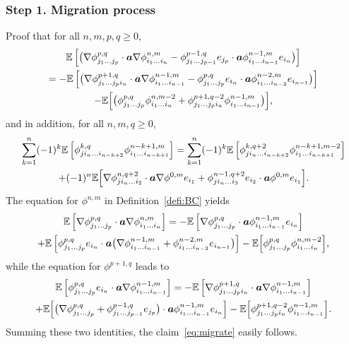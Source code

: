 \documentclass[10pt]{amsart}
\theoremstyle{plain}
\theoremstyle{definition}
\numberwithin{equation}{section}
\newcommand{\ee}{e}
\newcommand{\Aa}{\boldsymbol a}
\newcommand{\step}[1]{\subsubsection*{Step \textup #1}}
\newcommand{\expec}[1]{\mathbb{E}\left[ #1 \right]}
\newcommand{\Bexpec}[1]{\mathbb{E}\Bigl[ #1 \Bigr]}
\begin{document}
\step{1. Migration process} Proof that for all $n,m,p,q\ge0$,
\begin{multline}\label{eq:migrate}
\expec{\big(\nabla\phi^{p,q}_{j_1\ldots j_p}\cdot\Aa\nabla\phi^{n,m}_{i_1\ldots i_n}-\phi^{p-1,q}_{j_1\ldots j_{p-1}}\ee_{j_p}\cdot\Aa\phi^{n-1,m}_{i_1\ldots i_{n-1}}\ee_{i_n}\big)}\\
=-\expec{\big(\nabla\phi^{p+1,q}_{j_1\ldots j_{p}i_n}\cdot\Aa\nabla\phi^{n-1,m}_{i_1\ldots i_{n-1}}-\phi^{p,q}_{j_1\ldots j_{p}}\ee_{i_n}\cdot\Aa\phi^{n-2,m}_{i_1\ldots i_{n-2}}\ee_{i_{n-1}}\big)}\\
-\Bexpec{\big(\phi^{p,q}_{j_1\ldots j_p}\phi^{n,m-2}_{i_1\ldots i_n}+\phi^{p+1,q-2}_{j_1\ldots j_pi_n}\phi^{n-1,m}_{i_1\ldots i_{n-1}}\big)},
\end{multline}
and in addition, for all $n,m,q\ge0$,
\begin{multline}\label{eq:migrate-re}
\sum_{k=1}^n(-1)^k\expec{\phi^{k,q}_{ji_n\ldots i_{n-k+2}}\phi^{n-k+1,m}_{i_1\ldots i_{n-k+1}}}=\sum_{k=1}^{n}(-1)^k\expec{\phi^{k,q+2}_{ji_n\ldots i_{n-k+2}}\phi^{n-k+1,m-2}_{i_1\ldots i_{n-k+1}}}\\
+(-1)^n\Bexpec{\nabla\phi^{n,q+2}_{ji_n\ldots i_{2}}\cdot\Aa\nabla\phi^{0,m}\ee_{i_1}+\phi^{n-1,q+2}_{ji_n\ldots i_{3}}\ee_{i_{2}}\cdot\Aa\phi^{0,m}\ee_{i_{1}}}.
\end{multline}
The equation for $\phi^{n,m}$ in Definition~\ref{defi:BC} yields
\begin{multline*}
\expec{\nabla\phi^{p,q}_{j_1\ldots j_{p}}\cdot\Aa\nabla\phi^{n,m}_{i_1\ldots i_n}}=-\expec{\nabla\phi^{p,q}_{j_1\ldots j_{p}}\cdot\Aa\phi^{n-1,m}_{i_1\ldots i_{n-1}}\ee_{i_n}}\\
+\expec{\phi^{p,q}_{j_1\ldots j_{p}}\ee_{i_n}\cdot\Aa\big(\nabla\phi^{n-1,m}_{i_1\ldots i_{n-1}}+\phi^{n-2,m}_{i_1\ldots i_{n-2}}\ee_{i_{n-1}}\big)}
-\Bexpec{\phi^{p,q}_{j_1\ldots j_{p}}\phi^{n,m-2}_{i_1\ldots i_n}},
\end{multline*}
while the equation for $\phi^{{p+1},q}$ leads to
\begin{multline*}
\expec{\phi^{p,q}_{j_1\ldots j_p}\ee_{i_n}\cdot\Aa\nabla\phi^{n-1,m}_{i_1\ldots i_{n-1}}}=-\expec{\nabla\phi^{p+1,q}_{j_1\ldots j_pi_n}\cdot\Aa\nabla\phi^{n-1,m}_{i_1\ldots i_{n-1}}}\\
+\Bexpec{\big(\nabla\phi^{p,q}_{j_1\ldots j_p}+\phi^{p-1,q}_{j_1\ldots j_{p-1}}\ee_{j_p}\big)\cdot\Aa\phi^{n-1,m}_{i_1\ldots i_{n-1}}\ee_{i_n}}
-\Bexpec{\phi^{p+1,q-2}_{j_1\ldots j_pi_n}\phi^{n-1,m}_{i_1\ldots i_{n-1}}}.
\end{multline*}
Summing these two identities, the claim~\eqref{eq:migrate} easily follows.
\end{document}
